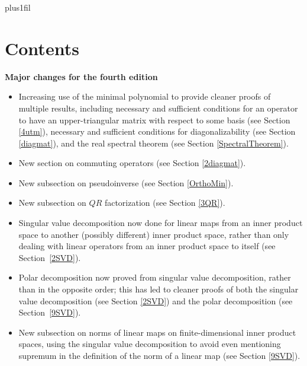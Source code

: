 {\overfullrule=0in

\parfillskip=14.2bp plus1fil
\chapter{Contents}\tableofcontents}

\newpage

\thispagestyle{empty}

\textbf{Major changes for the fourth edition}

\begin{itemize}

\item
Increasing use of the minimal polynomial to provide cleaner proofs of multiple results, including necessary and sufficient conditions for an operator to have an upper-triangular matrix with respect to some basis (see Section \ref{4utm}), necessary and sufficient conditions for diagonalizability (see Section \ref{diagmat}), and the real spectral theorem (see Section \ref{SpectralTheorem}).

\item
New section on commuting operators (see Section \ref{2diagmat}).

\item
New subsection on pseudoinverse (see Section \ref{OrthoMin}).

\item
New subsection on $QR$ factorization (see Section \ref{3QR}).

\item
Singular value decomposition now done for linear maps from an inner product space to another (possibly different) inner product space, rather than only dealing with linear operators from an inner product space to itself (see Section~\ref{2SVD}).

\item
Polar decomposition now proved from singular value decomposition, rather than in the opposite order; this has led to cleaner proofs of both the singular value decomposition (see Section \ref{2SVD}) and the polar decomposition (see Section~\ref{9SVD}).

\item
New subsection on norms of linear maps on finite-dimensional inner product spaces, using the singular value decomposition to avoid even mentioning supremum in the definition of the norm of a linear map (see Section \ref{9SVD}).


\end{itemize}
